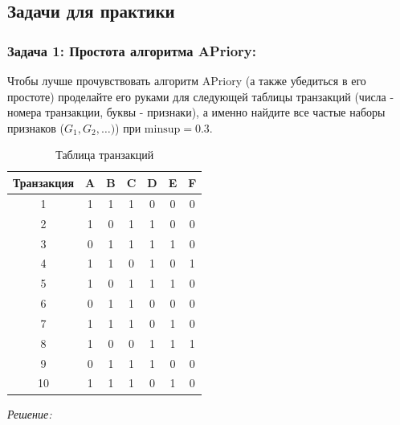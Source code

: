 \subsection{Задачи для практики}

\subsubsection{Задача 1: Простота алгоритма APriory:} Чтобы лучше прочувствовать алгоритм APriory (а также убедиться в его простоте) проделайте его руками для следующей таблицы транзакций (числа - номера транзакции, буквы - признаки), а именно найдите все частые наборы признаков (\(G_1, G_2, \ldots)\)) при \( \text{minsup}=0.3 \).
\begin{table}[ht!]
    \centering
    \caption{Таблица транзакций}
    \begin{tabular}{ccccccc}
        \toprule
        \textbf{Транзакция} & \textbf{A} & \textbf{B} & \textbf{C} & \textbf{D} & \textbf{E} & \textbf{F} \\
        \midrule
        1                   & 1          & 1          & 1          & 0          & 0          & 0          \\
        2                   & 1          & 0          & 1          & 1          & 0          & 0          \\
        3                   & 0          & 1          & 1          & 1          & 1          & 0          \\
        4                   & 1          & 1          & 0          & 1          & 0          & 1          \\
        5                   & 1          & 0          & 1          & 1          & 1          & 0          \\
        6                   & 0          & 1          & 1          & 0          & 0          & 0          \\
        7                   & 1          & 1          & 1          & 0          & 1          & 0          \\
        8                   & 1          & 0          & 0          & 1          & 1          & 1          \\
        9                   & 0          & 1          & 1          & 1          & 0          & 0          \\
        10                  & 1          & 1          & 1          & 0          & 1          & 0          \\
        \bottomrule
    \end{tabular}
\end{table}
\newline
\textit{Решение:}

